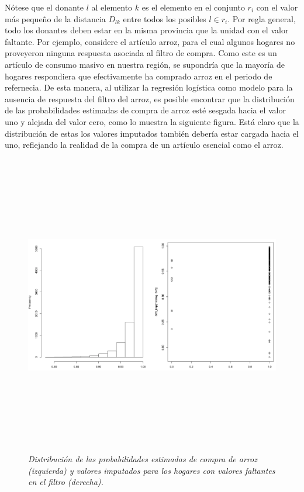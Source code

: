 \documentclass[
  12pt,
  spanish,
]{book}
\begin{document}
Nótese que el donante \(l\) al elemento \(k\) es el elemento en el conjunto \(r_i\) con el valor más pequeño de la distancia \(D_{lk}\) entre todos los posibles \(l \in r_i\). Por regla general, todo los donantes deben estar en la misma provincia que la unidad con el valor faltante. Por ejemplo, considere el artículo arroz, para el cual algunos hogares no proveyeron ninguna respuesta asociada al filtro de compra. Como este es un artículo de consumo masivo en nuestra región, se supondría que la mayoría de hogares respondiera que efectivamente ha comprado arroz en el periodo de refernecia. De esta manera, al utilizar la regresión logística como modelo para la ausencia de respuesta del filtro del arroz, es posible encontrar que la distribución de las probabilidades estimadas de compra de arroz esté sesgada hacia el valor uno y alejada del valor cero, como lo muestra la siguiente figura. Está claro que la distribución de estas los valores imputados también debería estar cargada hacia el uno, reflejando la realidad de la compra de un artículo esencial como el arroz.

\begin{figure}
\centering
\includegraphics[width=\textwidth,height=5.20833in]{Pics/11.png}
\caption{\emph{Distribución de las probabilidades estimadas de compra de arroz (izquierda) y valores imputados para los hogares con valores faltantes en el filtro (derecha).}}
\end{figure}
\end{document}
